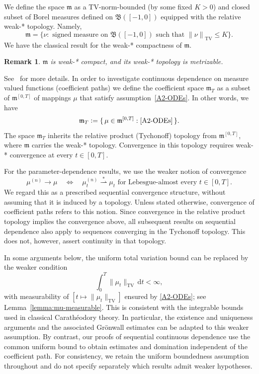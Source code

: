 \documentclass[reqno]{amsart}
\theoremstyle{plain}
\newtheorem{remark}{Remark}[section]
\numberwithin{equation}{section}
\numberwithin{definition}{section}
\newcommand{\norm}[1]{\ensuremath{\lVert#1\rVert}}
\newcommand{\dd}{\ensuremath{\mathrm{d}}}
\begin{document}
We define the space $\mathfrak{m}$ as a $\mathrm{TV}$-norm-bounded (by some fixed $K>0$) and closed subset of Borel measures defined on $\mathfrak{B}([-1,0])$ equipped with the relative weak-* topology. Namely, 
\begin{equation*}
    \mathfrak{m} = \{ \nu :   \text{ signed measure on } \mathfrak{B}([-1,0]) \text{ such that } \norm{\nu}_{\mathrm{TV}} \le K\}.
\end{equation*}
We have the classical result for the weak-* compactness of $\mathfrak{m}$. 
\begin{remark}
       $\mathfrak{m}$ is weak-* compact, and its weak-* topology is metrizable.
\end{remark}
\noindent
See~\cite[Thm. 3.6.17]{DM} for more details. In order to investigate continuous dependence on measure valued functions (coefficient paths) we define the coefficient space $\mathfrak{m}_T$ as a subset of $\mathfrak{m}^{ [0,T]}$ of mappings $\mu$ that satisfy assumption~\ref{A2-ODEs}.  In other words, we have
\begin{equation*}
    \mathfrak{m}_T \vcentcolon = \{ \, \mu \in \mathfrak{m}^{[0,T]} : 
    \ref{A2-ODEs}
    \,\}.
\end{equation*}
The space $\mathfrak m_T$ inherits the relative product
(Tychonoff) topology from $\mathfrak m^{[0,T]}$, where
$\mathfrak m$ carries the weak-* topology.
Convergence in this topology requires weak-* convergence
at every $t\in[0,T]$.

For the parameter-dependence results, we use the weaker
notion of convergence
\begin{equation*}
    \mu^{(n)}\to\mu
    \quad\Longleftrightarrow\quad
    \mu_t^{(n)}\overset{*}{\rightharpoonup}\mu_t
    \text{ for Lebesgue-almost every }t\in[0,T].
\end{equation*}
We regard this as a prescribed sequential convergence
structure, without assuming that it is induced by
a topology. Unless stated otherwise, convergence of
coefficient paths refers to this notion.
Since convergence in the relative product topology
implies the convergence above, all subsequent results
on sequential dependence also apply to sequences
converging in the Tychonoff topology. This does not,
however, assert continuity in that topology.

In some arguments below, the uniform total variation bound
can be replaced by the weaker condition
\begin{equation*}
    \int_0^T \|\mu_t\|_{\mathrm{TV}}\,\dd t<\infty,
\end{equation*}
with measurability of $[t\mapsto \|\mu_t\|_{\mathrm{TV}}]$ ensured by \ref{A2-ODEs}; see Lemma~\ref{lemma:mu-measurable}.
This is consistent with the integrable bounds used in
classical Carath\'eodory theory. In particular, the
existence and uniqueness arguments and the associated
Gr{\"o}nwall estimates can be adapted to this weaker assumption.
By contrast, our proofs of sequential continuous dependence
use the common uniform bound to obtain estimates and
domination independent of the coefficient path.
For consistency, we retain the uniform boundedness
assumption throughout and do not specify separately
which results admit weaker hypotheses.
\end{document}
